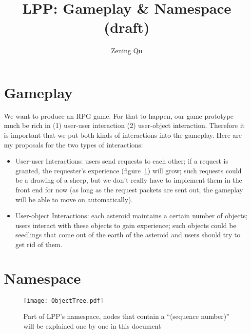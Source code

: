 \documentclass{article}
\begin{document}
\title{LPP: Gameplay \& Namespace (draft)}
\author{Zening Qu}
\maketitle

\section{Gameplay}
We want to produce an RPG game. For that to happen, our game prototype much be rich in (1) user-user interaction (2) user-object interaction. Therefore it is important that we put both kinds of interactions into the gameplay. Here are my proposals for the two types of interactions:

\begin{itemize}
\item User-user Interactions: users send requests to each other; if a request is granted, the requester's experience (figure~\ref{ns}) will grow; such requests could be a drawing of a sheep, but we don't really have to implement them in the front end for now (as long as the request packets are sent out, the gameplay will be able to move on automatically).
\item User-object Interactions: each asteroid maintains a certain number of objects; users interact with these objects to gain experience; such objects could be seedlings that come out of the earth of the asteroid and users should try to get rid of them.
\end{itemize}

\section{Namespace}

\begin{figure}[htbp]
\begin{center}
\texttt{[image: ObjectTree.pdf]}
\caption{Part of LPP's namespace, nodes that contain a ``(sequence number)'' will be explained one by one in this document}
\label{ns}
\end{center}
\end{figure}
\end{document}
